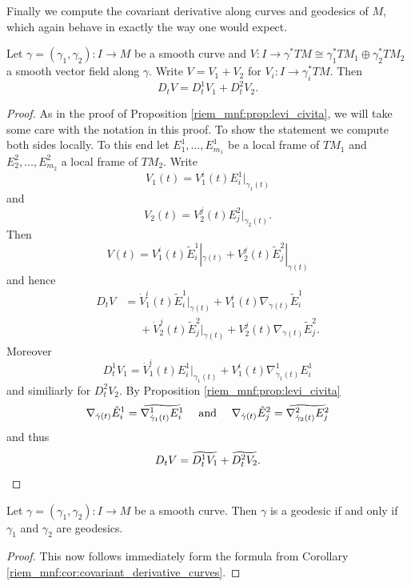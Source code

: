 Finally we compute the covariant derivative along curves and geodesics of $M$, which again behave in exactly the way one would expect. 

\begin{corollary}
    \label{riem_mnf:cor:covariant_derivative_curves}
    Let $\gamma = (\gamma_1,\gamma_2) \colon I \to M$ be a smooth curve and $V \colon I \to \gamma^\ast TM \cong \gamma_1^\ast TM_1 \oplus \gamma_2^\ast TM_2$ a smooth vector field along $\gamma$. Write $V= V_1 + V_2$ for $V_i \colon I \to \gamma_i^\ast TM$. Then 
    \[
    D_tV = D_t^1V_1 + D_t^2V_2.
    \]
\end{corollary}

\begin{proof}
    As in the proof of Proposition \ref{riem_mnf:prop:levi_civita}, we will take some care with the notation in this proof. To show the statement we compute both sides locally. To this end let $E_1^1,\ldots,E_{m_1}^1$ be a local frame of $TM_1$ and $E_2^2,\ldots,E_{m_2}^2$ a local frame of $TM_2$. Write 
    \[
    V_1(t) = V_1^i(t) E_i^1|_{\gamma_1(t)}
    \]
    and 
    \[
    V_2(t) = V_2^j(t) E_j^2|_{\gamma_2(t)}.
    \]
    Then 
    \[
    V(t) = V_1^i(t) \tilde{E}_i^1|_{\gamma(t)} + V_2^j(t) \tilde{E}_j^2|_{\gamma(t)}
    \]
    and hence 
    \begin{align*}
        D_tV & = \dot{V}_1^i(t)\tilde{E}_i^1|_{\gamma(t)} + V_1^i(t)\nabla_{\dot{\gamma}(t)}\tilde{E}_i^1 \\[.3em]
        &\phantom{=}+ \dot{V}_2^j(t)\tilde{E}_j^2|_{\gamma(t)} + V_2^j(t)\nabla_{\dot{\gamma}(t)}\tilde{E}_j^2.
    \end{align*}
Moreover 
\[
D_t^1V_1 = \dot{V}_1^i(t)E_i^1|_{\gamma_1(t)} + V_1^i(t)\nabla^1_{\dot{\gamma}_1(t)}E_i^1
\]
and similiarly for $D_t^2V_2$. By Proposition \ref{riem_mnf:prop:levi_civita}
\[
\nabla_{\dot{\gamma}(t)}\tilde{E}_i^1 = \reallywidetilde{\nabla^1_{\dot{\gamma}_1(t)}E_i^1}{6} \quad \text{ and } \quad \nabla_{\dot{\gamma}(t)}\tilde{E}_j^2 = \reallywidetilde{\nabla^2_{\dot{\gamma}_2(t)}E_j^2}{6}
\]
and thus 
\[
D_tV = \reallywidetilde{D_t^1V_1}{4} + \reallywidetilde{D_t^2V_2}{4}.
\]
\end{proof}

\begin{corollary}
    Let $\gamma = (\gamma_1,\gamma_2) \colon I \to M$ be a smooth curve. Then $\gamma$ is a geodesic if and only if $\gamma_1$ and $\gamma_2$ are geodesics.
\end{corollary}
\begin{proof}
   This now follows immediately form the formula from Corollary \ref{riem_mnf:cor:covariant_derivative_curves}.
\end{proof}

